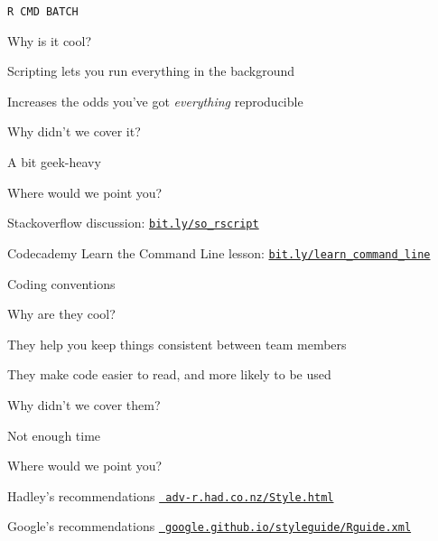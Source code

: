 \documentclass[12pt,t]{beamer}
\begin{document}
\begin{frame}[c]{\tt R CMD BATCH}

  \bbi
\item[] Why is it cool?
  \bi
\item Scripting lets you run everything in the background
  \item Increases the odds you've got \emph{everything\/} reproducible
    \ei
  \item[] Why didn't we cover it?
    \bi
  \item A bit geek-heavy
    \ei
  \item[] Where would we point you?
    \bi
    \item Stackoverflow discussion:
      \href{http://bit.ly/so_rscript}{\tt bit.ly/so\_rscript}
    \item Codecademy Learn the Command Line lesson:
      \href{http://bit.ly/learn_command_line}{\tt bit.ly/learn\_command\_line}
   \ei
 \ei


\end{frame}



\begin{frame}[c]{Coding conventions}

  \bbi
\item[] Why are they cool?
  \bi
  \item They help you keep things consistent between team members
  \item They make code easier to read, and more likely to be used
  \ei
\item[] Why didn't we cover them?
    \bi
    \item Not enough time
    \ei
\item[] Where would we point you?
    \bi
    \item Hadley's recommendations
  \href{http://adv-r.had.co.nz/Style.html}{\tt \footnotesize
    adv-r.had.co.nz/Style.html}
    \item Google's recommendations
  \href{https://google.github.io/styleguide/Rguide.xml}{\tt
      \footnotesize google.github.io/styleguide/Rguide.xml}
   \ei
\ei


\end{frame}
\end{document}
